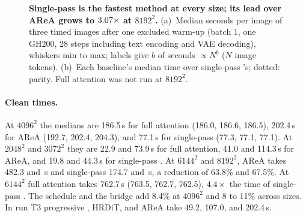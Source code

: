\ifshortversion\else
\begin{table}[!htbp]
  \caption{\textbf{Single-pass \sca{} is the fastest method at every size.} Expands the timing of Section~\ref{sec:sizes} and . Seconds per image of full attention, AReA, and single-pass \sca{}: batch 1 on an idle GH200, 28 steps with text encoding and VAE decoding, median of three timed images after an excluded warm-up (Appendix~\ref{app:timing}). $N$: image tokens; full attention was not run at $8192^2$; bold: fastest per size. Key result: single-pass \sca{} is 2.6 times faster than AReA at $4096^2$.\pendAppLatency}
  \label{tab:latency}
\end{table}
\fi
\begin{figure}[!htbp]
  \centering
  \caption{\textbf{Single-pass \sca{} is the fastest method at every size; its lead over AReA grows to $3.07\times$ at $8192^2$.} (a)~Median seconds per image of three timed images after one excluded warm-up (batch 1, one GH200, 28 steps including text encoding and VAE decoding), whiskers min to max; labels give $b$ of seconds $\propto N^b$ ($N$ image tokens). (b)~Each baseline's median time over single-pass \sca{}'s; dotted: parity. Full attention was not run at $8192^2$.\pendFigLatency}
  \label{fig:latency_full}
\end{figure}

\ifshortversion
\apxqualitytime
\else
\paragraph{Clean times.} At $4096^2$ the medians are 186.5\,s for full attention (186.0, 186.6, 186.5), 202.4\,s for AReA (192.7, 202.4, 204.3), and 77.1\,s for single-pass \sca{} (77.3, 77.1, 77.1). At $2048^2$ and $3072^2$ they are 22.9 and 73.9\,s for full attention, 41.0 and 114.3\,s for AReA, and 19.8 and 44.3\,s for single-pass \sca{}. At $6144^2$ and $8192^2$, AReA takes 482.3 and \ifdefined\hlLatEightArea\hlLatEightArea{}\fi\,s and single-pass \sca{} 174.7 and \hlLatEightSca\,s, a reduction of 63.8\% and 67.5\%. At $6144^2$ full attention takes 762.7\,s (763.5, 762.7, 762.5), $4.4\times$ the time of single-pass \sca{}. The schedule and the bridge add 8.4\% at $4096^2$ and 8 to 11\% across sizes. In run T3 progressive \sca{}, HRDiT, and AReA take 49.2, 107.0, and 202.4\,s.

